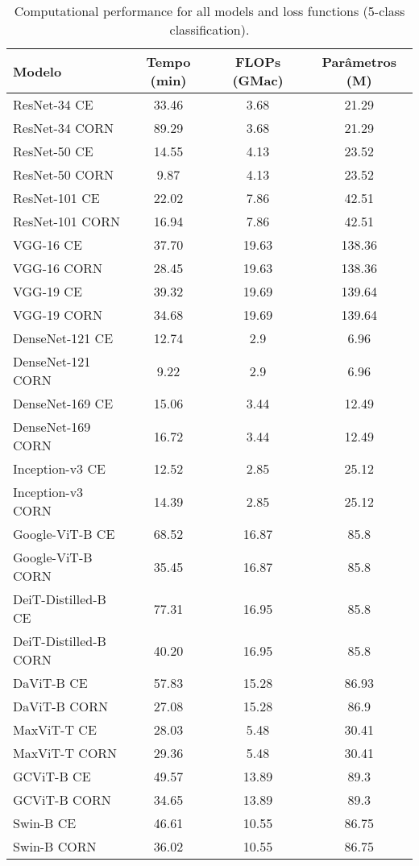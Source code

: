 \begin{table}[ht]
    \centering
    \begin{tabular}{lccc}
        \toprule
        \textbf{Modelo} & \textbf{Tempo (min)} & \textbf{FLOPs (GMac)} & \textbf{Parâmetros (M)} \\
        \midrule
        ResNet-34 CE & 33.46 & 3.68 & 21.29 \\
        ResNet-34 CORN & 89.29 & 3.68 & 21.29 \\
        ResNet-50 CE & 14.55 & 4.13 & 23.52 \\
        ResNet-50 CORN & 9.87 & 4.13 & 23.52 \\
        ResNet-101 CE & 22.02 & 7.86 & 42.51 \\
        ResNet-101 CORN & 16.94 & 7.86 & 42.51 \\
        VGG-16 CE & 37.70 & 19.63 & 138.36 \\
        VGG-16 CORN & 28.45 & 19.63 & 138.36 \\
        VGG-19 CE & 39.32 & 19.69 & 139.64 \\
        VGG-19 CORN & 34.68 & 19.69 & 139.64 \\
        DenseNet-121 CE & 12.74 & 2.9 & 6.96 \\
        DenseNet-121 CORN & 9.22 & 2.9 & 6.96 \\
        DenseNet-169 CE & 15.06 & 3.44 & 12.49 \\
        DenseNet-169 CORN & 16.72 & 3.44 & 12.49 \\
        Inception-v3 CE & 12.52 & 2.85 & 25.12 \\
        Inception-v3 CORN & 14.39 & 2.85 & 25.12 \\
        Google-ViT-B CE & 68.52 & 16.87 & 85.8 \\
        Google-ViT-B CORN & 35.45 & 16.87 & 85.8 \\
        DeiT-Distilled-B CE & 77.31 & 16.95 & 85.8 \\
        DeiT-Distilled-B CORN & 40.20 & 16.95 & 85.8 \\
        DaViT-B CE & 57.83 & 15.28 & 86.93 \\
        DaViT-B CORN & 27.08 & 15.28 & 86.9 \\
        MaxViT-T CE & 28.03 & 5.48 & 30.41 \\
        MaxViT-T CORN & 29.36 & 5.48 & 30.41 \\
        GCViT-B CE & 49.57 & 13.89 & 89.3 \\
        GCViT-B CORN & 34.65 & 13.89 & 89.3 \\
        Swin-B CE & 46.61 & 10.55 & 86.75 \\
        Swin-B CORN & 36.02 & 10.55 & 86.75 \\
        \bottomrule
    \end{tabular}
    \caption{Computational performance for all models and loss functions (5-class classification).}
    \label{tab:computational_performance}
\end{table}

